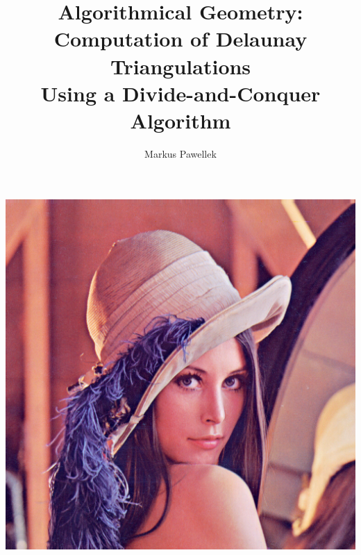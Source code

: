 \documentclass[aspectratio=169,fleqn]{beamer}
\title{%
  Algorithmical Geometry: \\ Computation of Delaunay Triangulations \\ Using a Divide-and-Conquer Algorithm%
}
\author{Markus Pawellek}
\begin{document}


\begin{frame}[plain]{}
  \centering
  \includegraphics[height=\textheight]{images/lenna.png}
\end{frame}
\end{document}
